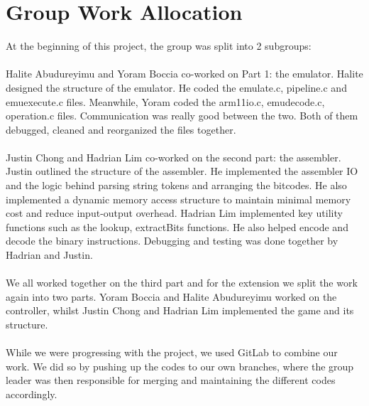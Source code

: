 \documentclass[a4paper]{article}
\begin{document}
\newpage

\section{Group Work Allocation}
At the beginning of this project, the group was split into 2 subgroups:\\ \\
Halite Abudureyimu and Yoram Boccia co-worked on Part 1: the emulator. Halite designed the structure of the emulator. He coded the emulate.c, pipeline.c and emuexecute.c files. Meanwhile, Yoram coded the arm11io.c, emudecode.c, operation.c files. Communication was really good between the two. Both of them debugged, cleaned and reorganized the files together.
\\\\
Justin Chong and Hadrian Lim co-worked on the second part: the assembler. Justin outlined the structure of the assembler. He implemented the assembler IO and the logic behind parsing string tokens and arranging the bitcodes. He also implemented a dynamic memory access structure to maintain minimal memory cost and reduce input-output overhead. Hadrian Lim implemented key utility functions such as the lookup, extractBits functions. He also helped encode and decode the binary instructions. Debugging and testing was done together by Hadrian and Justin.
\\\\
We all worked together on the third part and for the extension we split the work again into two parts. Yoram Boccia and Halite Abudureyimu worked on the controller, whilst Justin Chong and Hadrian Lim implemented the game and its structure.  
\\\\
While we were progressing with the project, we used GitLab to combine our work. We did so by pushing up the codes to our own branches, where the group leader was then responsible for merging and maintaining the different codes accordingly.
\end{document}
